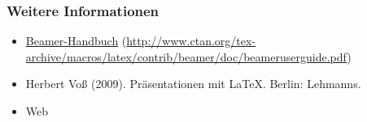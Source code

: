 \documentclass[t]{beamer} %
\begin{document}
\begin{frame}
  \frametitle{Weitere Informationen}

  \begin{itemize}
  \item
    \href{http://ctan.org/get/macros/latex/contrib/beamer/doc/beameruserguide.pdf}{Beamer-Handbuch}
    (\url{http://www.ctan.org/tex-archive/macros/latex/contrib/beamer/doc/beameruserguide.pdf})
  \item Herbert Voß (2009). Präsentationen mit LaTeX. Berlin:
    Lehmanns.
  \item Web
  \end{itemize}
\end{frame}
\end{document}
